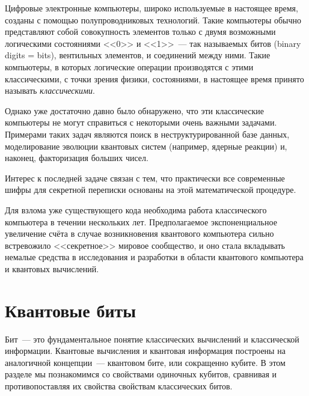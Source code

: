 \begin{multicols}{2}
{    Цифровые электронные компьютеры, широко используемые в настоящее время, созданы с помощью полупроводниковых технологий. Такие компьютеры обычно представляют собой совокупность элементов только с двумя возможными логическими состояниями <<0>> и <<1>>~--- так называемых битов (binary digits = bits), вентильных элементов, и соединений между ними. Такие компьютеры, в которых логические операции производятся с этими классическими, с точки зрения физики, состояниями, в настоящее время принято называть \emph{классическими}.

    Однако уже достаточно давно было обнаружено, что эти классические компьютеры не могут справиться с некоторыми очень важными задачами. Примерами таких задач являются поиск в неструктурированной базе данных, моделирование эволюции квантовых систем (например, ядерные реакции) и, наконец, факторизация больших чисел.

    Интерес к последней задаче связан с тем, что практически все современные шифры для секретной переписки основаны на этой математической процедуре.

    Для взлома уже существующего кода необходима работа классического компьютера в течении нескольких лет. Предполагаемое экспоненциальное увеличение счёта в случае возникновения квантового компьютера сильно встревожило <<секретное>> мировое сообщество, и оно стала вкладывать немалые средства в исследования и разработки в области квантового компьютера и квантовых вычислений.}
    \section*{Квантовые биты}
    \normalsize{Бит~--- это фундаментальное понятие классических вычислений и классической информации.
    Квантовые вычисления и квантовая информация построены на аналогичной концепции~---
    квантовом бите, или сокращенно кубите. В этом разделе мы познакомимся со свойствами одиночных
    кубитов, сравнивая и противопоставляя их свойства свойствам классических битов.
    
}
\end{multicols}
